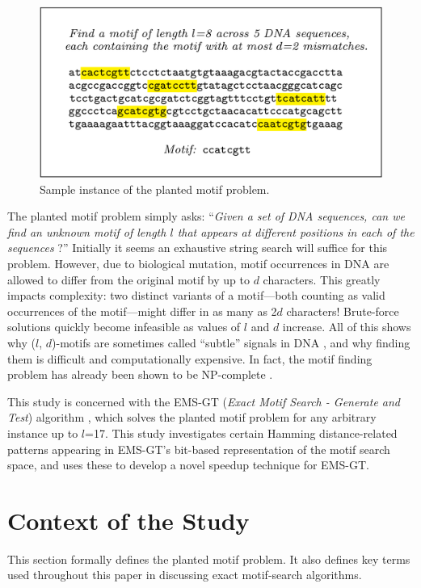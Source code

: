 \documentclass[oneside,12pt]{DISCSthesis}
\begin{document}
		\begin{figure}[h] \label{fig:example}
			\centering
			\includegraphics[width=5.5in]{img/example}
			\caption{Sample instance of the planted motif problem.}
			\end{figure}

		The planted motif problem simply asks: ``\emph{Given a set of DNA sequences, can we find an unknown motif of length $l$ that appears at different positions in each of the sequences} \cite{pevzner2000combinatorial}?'' Initially it seems an exhaustive string search will suffice for this problem. However, due to biological mutation, motif occurrences in DNA are allowed to differ from the original motif by up to $d$ characters. This greatly impacts complexity: two distinct variants of a motif---both counting as valid occurrences of the motif---might differ in as many as 2$d$ characters! Brute-force solutions quickly become infeasible as values of $l$ and $d$ increase. All of this shows why ($l$, $d$)-motifs are sometimes called ``subtle'' signals in DNA  \cite{pevzner2000combinatorial}, and why finding them is difficult and computationally expensive. In fact, the motif finding problem has already been shown to be NP-complete \cite{pms2014}. 

		This study is concerned with the EMS-GT (\emph{Exact Motif Search - Generate and Test}) algorithm \cite{nabos2015dissertation}, which solves the planted motif problem for any arbitrary instance up to $l$=17. This study investigates certain Hamming distance-related patterns appearing in EMS-GT's bit-based representation of the motif search space, and uses these to develop a novel speedup technique for EMS-GT.

	\section{Context of the Study}
		This section formally defines the planted motif problem. It also defines key terms used throughout this paper in discussing exact motif-search algorithms.
\end{document}
